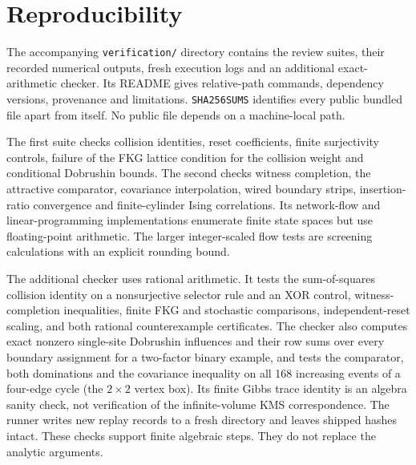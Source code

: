 \section{Reproducibility}\label{sec:repro}
The accompanying \texttt{verification/} directory contains the review suites, their recorded numerical outputs, fresh execution logs and an additional exact-arithmetic checker. Its README gives relative-path commands, dependency versions, provenance and limitations. \texttt{SHA256SUMS} identifies every public bundled file apart from itself. No public file depends on a machine-local path.

The first suite checks collision identities, reset coefficients, finite surjectivity controls, failure of the FKG lattice condition for the collision weight and conditional Dobrushin bounds. The second checks witness completion, the attractive comparator, covariance interpolation, wired boundary strips, insertion-ratio convergence and finite-cylinder Ising correlations. Its network-flow and linear-programming implementations enumerate finite state spaces but use floating-point arithmetic. The larger integer-scaled flow tests are screening calculations with an explicit rounding bound.

The additional checker uses rational arithmetic. It tests the sum-of-squares collision identity on a nonsurjective selector rule and an XOR control, witness-completion inequalities, finite FKG and stochastic comparisons, independent-reset scaling, and both rational counterexample certificates. The checker also computes exact nonzero single-site Dobrushin influences and their row sums over every boundary assignment for a two-factor binary example, and tests the comparator, both dominations and the covariance inequality on all 168 increasing events of a four-edge cycle (the $2\times2$ vertex box). Its finite Gibbs trace identity is an algebra sanity check, not verification of the infinite-volume KMS correspondence. The runner writes new replay records to a fresh directory and leaves shipped hashes intact. These checks support finite algebraic steps. They do not replace the analytic arguments.

